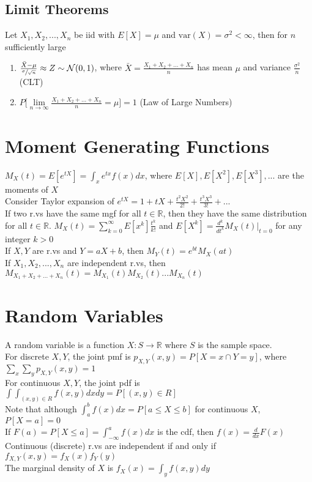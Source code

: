 \documentclass{article}
\newcommand{\V}{\mbox{var}}
\begin{document}
\subsection{Limit Theorems}
Let $X_1, X_2, ..., X_n$ be iid with $E[X] = \mu$ and $\V(X) = \sigma^2 < \infty$, then for $n$ sufficiently large 
\begin{enumerate}
\item $\frac{\bar{X} - \mu}{\sfrac{\sigma}{\sqrt{n}}} \approx Z \sim \mathcal{N}(0, 1)$, where $\bar{X} = \frac{X_1 + X_2 + ... + X_n}{n}$ has mean $\mu$ and variance $\frac{\sigma^2}{n}$ (CLT)
\item $P\Big[\lim\limits_{n\to \infty} \frac{X_1 + X_2 + ... + X_n}{n} = \mu \Big] = 1$ (Law of Large Numbers)
\end{enumerate}

\section{Moment Generating Functions}
$M_X(t) = E[e^{tX}] = \int_x e^{tx}f(x)dx$, where $E[X], E[X^2], E[X^3], ...$ are the moments of $X$ \\
Consider Taylor expansion of $e^{tX} = 1 + tX + \frac{t^2X^2}{2!} + \frac{t^3X^3}{3!} + ... $ \\
If two r.vs have the same mgf for all $t \in \mathbb{R}$, then they have the same distribution for all $t \in \mathbb{R}$.
$M_X(t) = \sum_{k=0}^{\infty}E[x^k]\frac{t^k}{k!}$ and $E[X^k] = \frac{d^k}{dt^k}M_X(t) \big |_{t=0}$ for any integer $k > 0$ \\
If $X, Y$ are r.vs and $Y = aX + b$, then $M_Y(t) = e^{bt}M_X(at)$ \\
If $X_1, X_2, ..., X_n$ are independent r.vs, then $M_{X_1 + X_2 + ... + X_n}(t) = M_{X_1}(t)M_{X_2}(t) ... M_{X_n}(t)$

\section{Random Variables}
A random variable is a function $X: S \to \mathbb{R}$ where $S$ is the sample space.\\
For discrete $X, Y$, the joint pmf is $p_{X,Y}(x,y) = P[X = x \cap Y = y]$, where $\sum_x \sum_y p_{X, Y}(x, y)=1$\\
For continuous $X, Y$, the joint pdf is $\int \int_{(x,y) \in R} f(x, y)dx dy = P[(x, y) \in R]$ \\
Note that although $\int_a^b f(x)dx = P[a \leq X \leq b]$ for continuous $X$, $P[X=a] = 0$ \\
If $F(a) = P[X\leq a] = \int_{-\infty}^a f(x)dx$ is the cdf, then $f(x) = \frac{d}{dx}F(x)$ \\
Continuous (discrete) r.vs are independent if and only if $f_{X,Y}(x,y) = f_X(x) f_Y(y) $ \\
The marginal density of $X$ is $f_X(x) = \int_y f(x,y)dy$ 
\end{document}
